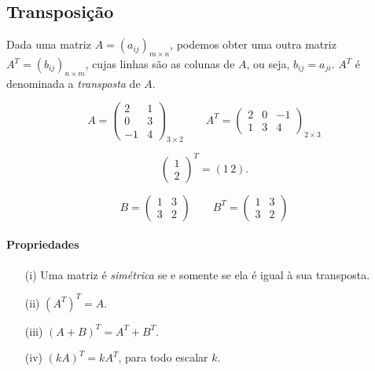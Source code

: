 \subsection{Transposição}

Dada uma matriz $A = (a_{ij})_{m\times n}$, podemos obter uma outra matriz $A^T = (b_{ij})_{n\times m}$, cujas linhas são as colunas de $A$, ou seja, $b_{ij} = a_{ji}$. $A^T$ é denominada a \emph{transposta} de $A$.

\begin{exemplo}
    \begin{equation*}
        A = \begin{pmatrix}
              2 & 1\\
              0 & 3\\
              -1 & 4
            \end{pmatrix}
        _{3\times 2} \qquad A^T = 
            \begin{pmatrix}
                2 & 0 & -1\\
                1 & 3 & 4
            \end{pmatrix}
        _{2 \times 3}
    \end{equation*}
\end{exemplo}

\begin{exemplo}
    \begin{equation*}
        \begin{pmatrix}
            1\\
            2
        \end{pmatrix}
        ^T = \left( 1\, 2\right).
    \end{equation*}
\end{exemplo}

\begin{exemplo}
    \begin{equation*}
        B = \begin{pmatrix}
                1 & 3\\
                3 & 2
            \end{pmatrix}
        \qquad B^T = 
            \begin{pmatrix}
                1 & 3 \\
                3 & 2
            \end{pmatrix}
    \end{equation*}
\end{exemplo}

\paragraph*{Propriedades}
\begin{itemize}
    \item[(i)] Uma matriz é \emph{simétrica} se e somente se ela é igual à sua transposta.
    \item[(ii)] $\left(A^T\right)^T = A$.
    \item[(iii)] $(A+B)^T = A^T + B^T$.
    \item[(iv)] $(kA)^T = kA^T$, para todo escalar $k$.
\end{itemize}

